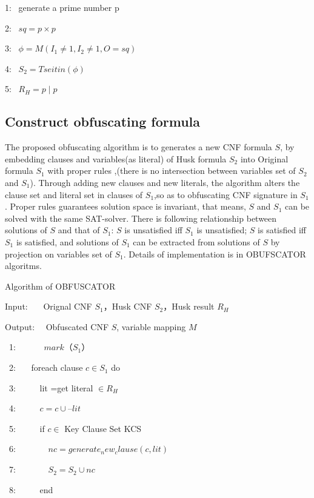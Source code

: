 \documentclass[runningheads,a4paper]{llncs}
\begin{document}
1:~ generate a prime number p

2:~ $sq=p\times p$

3:~ $\phi= M(I_1 \neq 1, I_2\neq 1, O=sq)$

4:~ $S_2=Tseitin(\phi)$

5:~ $R_H=p\mid p$

\subsection{Construct obfuscating formula}

The proposed obfuscating algorithm is to generates a new CNF formula $S$, 
by embedding clauses and variables(as literal) of Husk formula $S_2$ into Original formula $S_1$ with proper rules ,(there is no intersection between variables set of $S_2$ and $S_1$). 
Through adding new clauses and new literals, the algorithm alters the clause set and literal set in clauses of $S_1$,so as to obfuscating CNF signature in $S_1$.
Proper rules guarantees solution space is invariant, that means, $S$ and $S_1$ can be solved with the same SAT-solver.
There is following relationship between solutions of $S$ and that of $S_1$: $S$ is unsatisfied iff $S_1$ is unsatisfied;
$S$ is satisfied iff $S_1$ is satisfied, and solutions of $S_1$ can be extracted from solutions of $S$ by projection on variables set of $S_1$.
Details of implementation is in OBUFSCATOR algoritms.

\noindent Algorithm of OBFUSCATOR

Input:~~~ Orignal CNF $S_1$，Husk CNF $S_2$，Husk result $R_H$

Output:~~ Obfuscated CNF $S$, variable mapping $M$ 


~1:~~~~~~   $mark（S_1）$


~2:~~~  foreach clause $c \in S_1$  do

~3:~~~~~      lit =get literal $ \in R_H$

~4:~~~~~      $c=c \cup –lit$


~5:~~~~~         if  $c \in$  Key Clause Set KCS

~6:~~~~~~~           $nc=generate_new_clause(c,lit)$

~7:~~~~~~~           $S_2=S_2 \cup nc$

~8:~~~~~         end  

\end{document}
